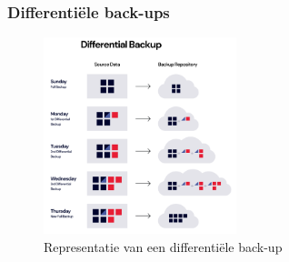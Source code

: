\subsubsection{Differentiële back-ups}
 \begin{figure}[h]
    \centering
    \captionsetup{justification=centering}
    \includegraphics[width=0.5\textwidth]{img/diff.png}  
    \caption{Representatie van een differentiële back-up \autocite{Rivas2022}}   
    \label{fig:diffrback-up}           
\end{figure}
